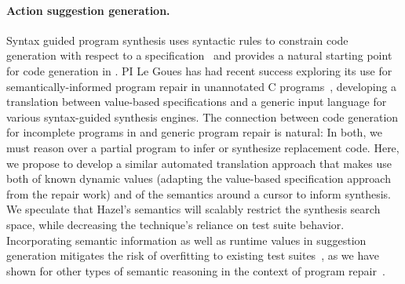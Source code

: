 \paragraph{Action suggestion generation.}  Syntax guided program synthesis uses
syntactic rules to constrain code generation with respect to a
specification~\cite{sygus} and provides a natural starting point for
code generation in \Hazel. PI Le Goues has had recent success exploring its use
for semantically-informed program repair in unannotated C
programs~\cite{sygus-icsme-era}, developing a translation between value-based
specifications and a generic input language for various syntax-guided synthesis
engines.  The connection between code generation for incomplete programs in \Hazel
and generic program repair is natural: In both, we must reason over a partial
program to infer or synthesize replacement code.  Here, we propose to develop a
similar automated translation approach that makes use both of known
dynamic values (adapting the value-based specification approach from the repair
work) and of the semantics around a cursor to inform synthesis. We speculate
that Hazel's semantics will scalably restrict the synthesis search space, while
decreasing the technique's reliance on test suite behavior.  Incorporating
semantic information as well as runtime values in suggestion generation mitigates the
risk of overfitting to existing test suites~\cite{Qi13issta,Smith15fse}, as we
have shown for other types of semantic reasoning in the context of program repair~\cite{Ke15ase}.


